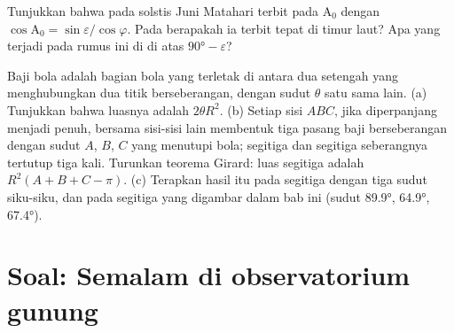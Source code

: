 \begin{exercise}[$\star\star\star$]\label{exo:b1:spherical-astronomy:11}
Tunjukkan bahwa pada solstis Juni Matahari terbit pada  $\mathrm{A}_0$ dengan $\cos\mathrm{A}_0 = \sin\varepsilon/\cos\varphi$. Pada  berapakah ia terbit tepat di timur laut? Apa yang terjadi pada rumus ini di  di atas $\ang{90} - \varepsilon$?
\end{exercise}

\begin{exercise}[$\star\star\star$]\label{exo:b1:spherical-astronomy:12}
Baji bola adalah bagian bola yang terletak di antara dua setengah  yang menghubungkan dua titik berseberangan, dengan sudut $\theta$ satu sama lain. (a) Tunjukkan bahwa luasnya adalah $2\theta R^2$. (b) Setiap sisi  $ABC$, jika diperpanjang menjadi  penuh, bersama sisi-sisi lain membentuk tiga pasang baji berseberangan dengan sudut $A$, $B$, $C$ yang menutupi bola; segitiga dan segitiga seberangnya tertutup tiga kali. Turunkan teorema Girard: luas segitiga adalah $R^2(A + B + C - \pi)$. (c) Terapkan hasil itu pada segitiga dengan tiga sudut siku-siku, dan pada segitiga yang digambar dalam bab ini (sudut \ang{89.9}, \ang{64.9}, \ang{67.4}).
\end{exercise}

\section{Soal: Semalam di observatorium gunung}

